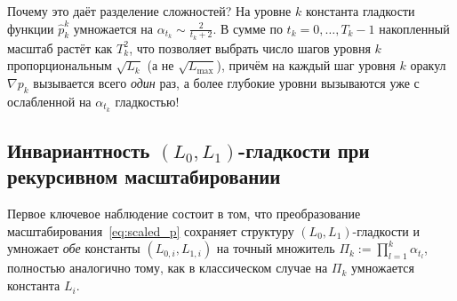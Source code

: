\documentclass[11pt, a4paper]{article}
\theoremstyle{definition}
\begin{document}
Почему это даёт разделение сложностей? На уровне $k$ константа гладкости функции $\hat{p}_k^k$ умножается на $\alpha_{t_k} \sim \frac{2}{t_k + 2}$. В сумме по $t_k = 0, \dots, T_k - 1$ накопленный масштаб растёт как $T_k^2$, что позволяет выбрать число шагов уровня $k$ пропорциональным $\sqrt{L_k}$ (а не $\sqrt{L_{\max}}$), причём на каждый шаг уровня $k$ оракул $\nabla p_k$ вызывается всего \emph{один} раз, а более глубокие уровни вызываются уже с ослабленной на $\alpha_{t_k}$ гладкостью!

\subsection{Инвариантность $(L_0, L_1)$-гладкости при рекурсивном масштабировании}

Первое ключевое наблюдение состоит в том, что преобразование масштабирования~\eqref{eq:scaled_p} сохраняет структуру $(L_0, L_1)$-гладкости и умножает \emph{обе} константы $(L_{0,i}, L_{1,i})$ на точный множитель $\Pi_k := \prod_{l=1}^k \alpha_{t_l}$, полностью аналогично тому, как в классическом случае на $\Pi_k$ умножается константа $L_i$.
\end{document}

